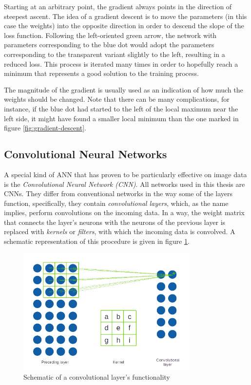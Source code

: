 \documentclass[11pt, a4paper]{article}
\begin{document}
Starting at an arbitrary point, the gradient always points in the direction of steepest ascent. The idea of a gradient descent is to move the parameters (in this case the weights) into the opposite direction in order to descend the slope of the loss function. Following the left-oriented green arrow, the network with parameters corresponding to the blue dot would adopt the parameters corresponding to the transparent variant slightly to the left, resulting in a reduced loss. This process is iterated many times in order to hopefully reach a minimum that represents a good solution to the training process.

The magnitude of the gradient is usually used as an indication of how much the weights should be changed. Note that there can be many complications, for instance, if the blue dot had started to the left of the local maximum near the left side, it might have found a smaller local minimum than the one marked in figure \ref{fig:gradient-descent}.










\subsection{Convolutional Neural Networks}
A special kind of ANN that has proven to be particularly effective on image data is the \emph{Convolutional Neural Network (CNN)}. All networks used in this thesis are CNNs. They differ from conventional networks in the way some of the layers function, specifically, they contain \emph{convolutional layers}, which, as the name implies, perform convolutions on the incoming data. In a way, the weight matrix that connects the layer's neurons with the neurons of the previous layer is replaced with \emph{kernels} or \emph{filters}, with which the incoming data is convolved. A schematic representation of this procedure is given in figure \ref{fig:convolutional-layer}.

\begin{figure}[h!tb]
	\centering
	\includegraphics[width=0.8\textwidth]{images/convolution_layer.png}
	\caption[Functionality of convolutional layers]{Schematic of a convolutional layer's functionality}
	\label{fig:convolutional-layer}
\end{figure}
\end{document}
